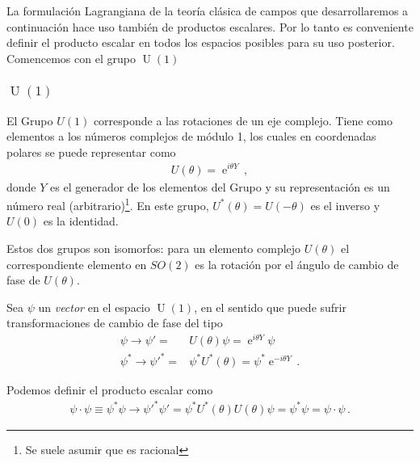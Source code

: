 La formulación Lagrangiana de la teoría clásica de campos que desarrollaremos a continuación hace uso también de productos escalares. Por lo tanto es conveniente definir el producto escalar en todos los espacios posibles para su uso posterior.  Comencemos con el grupo $\operatorname{U}(1)$

\subsubsection{$\operatorname{U}(1)$}
 El Grupo $U(1)$ corresponde a las rotaciones de un eje complejo. Tiene como elementos a los números complejos de módulo 1, los cuales en coordenadas polares se puede representar como
\begin{align}
  U(\theta)=\operatorname{e}^{i \theta Y}\,,
\end{align}
donde $Y$ es el generador de los elementos del Grupo y su representación es un número real (arbitrario)\footnote{Se suele asumir que es racional}.  En este grupo, $U^{*}(\theta)=U(-\theta)$ es el inverso y $U(0)$ es la identidad.

Estos dos grupos son isomorfos: para un elemento complejo $U(\theta)$ el correspondiente elemento en $SO(2)$ es la rotación por el ángulo de cambio de fase de $U(\theta)$.

\begin{frame}
Sea $\psi$ un \emph{vector} en el espacio $\operatorname{U}(1)$, en el sentido que puede sufrir transformaciones de cambio de fase del tipo
\begin{align}
  \psi\to \psi'=& U(\theta)\psi= \operatorname{e}^{i \theta Y}\psi \nonumber\\
  \psi^{*}\to {\psi'}^{*}=&\psi^{*} U^{*}(\theta)=\psi^{*}\operatorname{e}^{-i \theta Y}\,.
\end{align}


Podemos definir el producto escalar como
\begin{align}
  \psi\cdot \psi\equiv\psi^{*} \psi
  \to {\psi'}^{*} \psi'=\psi^{*} U^{*}(\theta) U(\theta) \psi=\psi^{*} \psi=\psi\cdot \psi\,.
\end{align}
\end{frame}


